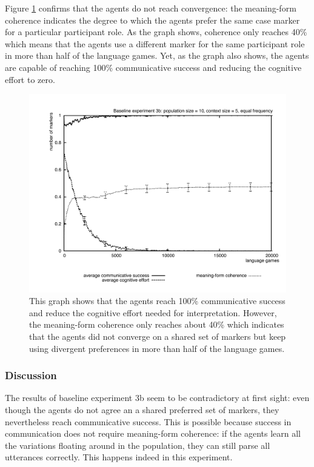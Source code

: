 Figure \ref{f:base3-effort3b} confirms that the agents do not reach convergence: the meaning-form coherence indicates the degree to which the agents prefer the same case marker for a particular participant role. As the graph shows, coherence only reaches 40\% which means that the agents use a different marker for the same participant role in more than half of the language games. Yet, as the graph also shows, the agents are capable of reaching 100\% communicative success  and reducing the cognitive effort to zero.
\begin{figure}[t]
\centerline{\includegraphics[width=\textwidth]{Chapter3/figs/graph-base3-effort3b}}
  \caption[Baseline experiment 3b: success, effort and coherence]{This graph shows that the agents reach 100\% communicative success and reduce the cognitive effort needed for interpretation. However, the meaning-form coherence only reaches about 40\% which indicates that the agents did not converge on a shared set of markers but keep using divergent preferences in more than half of the language games.}
   \label{f:base3-effort3b}
\end{figure}


\subsubsection{Discussion}
 The results of baseline experiment 3b seem to be contradictory at first sight: even though the agents do not agree an a shared preferred set of markers, they nevertheless reach communicative success. This is possible because success in communication does not require meaning-form coherence: if the agents learn all the variations floating around in the population, they can still parse all utterances correctly. This happens indeed in this experiment.

